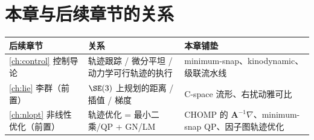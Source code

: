 \section*{本章与后续章节的关系}
\begin{table}[H]\centering\small
\begin{tabular}{lll}
\toprule
后续章节 & 关系 & 本章铺垫 \\
\midrule
\cref{ch:control} 控制导论 & 轨迹跟踪 / 微分平坦 / 动力学可行轨迹的执行 & minimum-snap、kinodynamic、级联流水线 \\
\cref{ch:lie} 李群（前置） & $\SE(3)$ 上规划的距离 / 插值 / 梯度 & C-space 流形、右扰动雅可比 \\
\cref{ch:nlopt} 非线性优化（前置） & 轨迹优化 = 最小二乘/QP + GN/LM & CHOMP 的 $\mathbf{A}^{-1}\nabla$、minimum-snap QP、因子图轨迹优化 \\
\bottomrule
\end{tabular}
\end{table}

